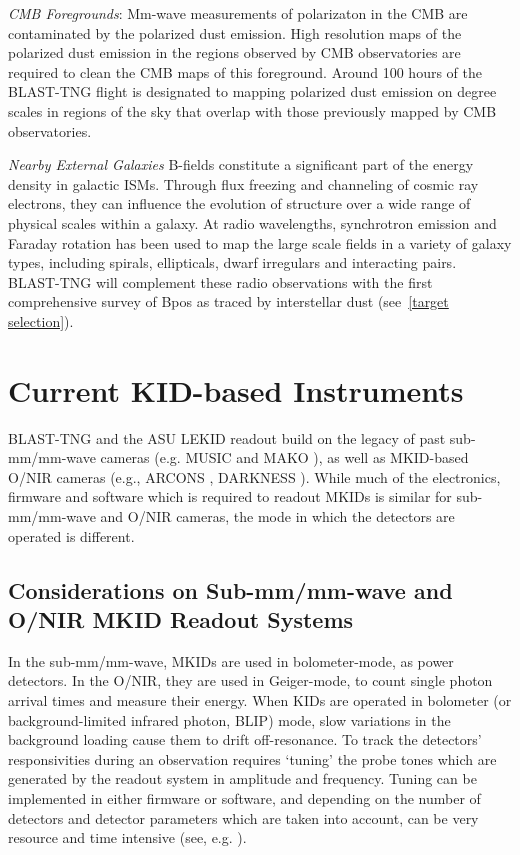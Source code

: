 {\vspace{5mm}

\textit{CMB Foregrounds}: Mm-wave measurements of polarizaton in the CMB are contaminated by the polarized dust emission. High resolution maps of the polarized dust emission in the regions observed by CMB observatories are required to clean the CMB maps of this foreground. Around 100 hours of the BLAST-TNG flight is designated to mapping polarized dust emission on degree scales in regions of the sky that overlap with those previously mapped by CMB observatories.

\vspace{5mm}

\textit{Nearby External Galaxies} B-fields constitute a significant part of the energy density in galactic ISMs. Through flux freezing and channeling of cosmic ray electrons, they can influence the evolution of structure over a wide range of physical scales within a galaxy. At radio wavelengths, synchrotron emission and Faraday rotation has been used to map the large scale fields in a variety of galaxy types, including spirals, ellipticals, dwarf irregulars and interacting pairs. BLAST-TNG will complement these radio observations with the first comprehensive survey of \gls{Bpos} as traced by interstellar dust (see~\ref{target selection}).

\section{Current KID-based Instruments}\label{kid cameras}

BLAST-TNG and the ASU LEKID readout build on the legacy of past sub-mm/mm-wave cameras (e.g. MUSIC \citep{golwala2012status} and MAKO \citep{swenson2012mako}), as well as MKID-based O/NIR cameras (e.g., ARCONS \citep{mazin2013arcons}, DARKNESS \citep{meeker2018darkness,strader2016digitial}). While much of the electronics, firmware and software which is required to readout MKIDs is similar for sub-mm/mm-wave and O/NIR cameras, the mode in which the detectors are operated is different.

\subsection{Considerations on Sub-mm/mm-wave and O/NIR MKID Readout Systems}

In the sub-mm/mm-wave, MKIDs are used in bolometer-mode, as power detectors. In the O/NIR, they are used in Geiger-mode, to count single photon arrival times and measure their energy. When KIDs are operated in bolometer (or background-limited infrared photon, BLIP) mode, slow variations in the background loading cause them to drift off-resonance. To track the detectors' responsivities during an observation requires `tuning' the probe tones which are generated by the readout system in amplitude and frequency. Tuning can be implemented in either firmware or software, and depending on the number of detectors and detector parameters which are taken into account, can be very resource and time intensive (see, e.g. \citet{dodkins2018mkid}).

}
